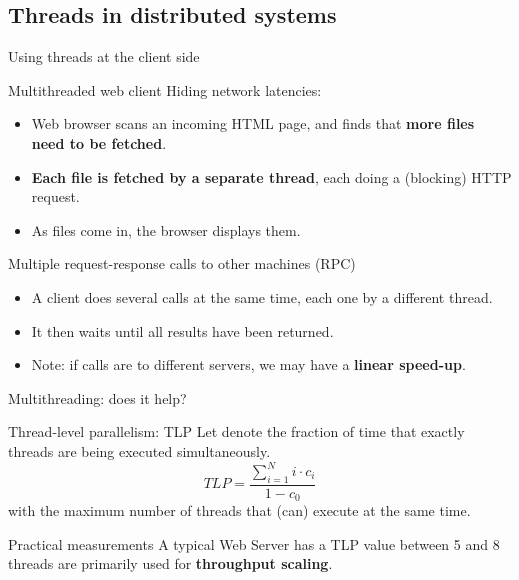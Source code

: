 \subsection{Threads in distributed systems}
\begin{frame}{Using threads at the client side}
  \begin{block}{Multithreaded web client}
    Hiding network latencies:
    \begin{itemize}\tightlist
      \item Web browser scans an incoming HTML page, and finds that \textbf{more files need to be fetched}.
      \item \textbf{Each file is fetched by a separate thread}, each doing a (blocking) HTTP request.
      \item As files come in, the browser displays them.
    \end{itemize}
  \end{block}
  \begin{block}{Multiple request-response calls to other machines (RPC)}
    \begin{itemize}\tightlist
      \item A client does several calls at the same time, each one by a different thread.
      \item It then waits until all results have been returned.
      \item Note: if calls are to different servers, we may have a \textbf{linear speed-up}.
    \end{itemize}
  \end{block}
\end{frame}
\begin{frame}{Multithreading: does it help?}
  \begin{block}{Thread-level parallelism: TLP}
    Let  denote the fraction of time that exactly  threads are being executed
    simultaneously.
    \[ TLP = \frac{\sum_{i=1}^N i \cdot c_i}{1- c_0} \]
    with  the maximum number of threads that (can) execute at the same time.
  \end{block}
  \onslide
  \begin{block}{Practical measurements}
    A typical Web Server has a TLP value between 5 and 8 \mathexpr{\Rightarrow}
    threads are primarily used for \textbf{throughput scaling}.
  \end{block}
\end{frame}
